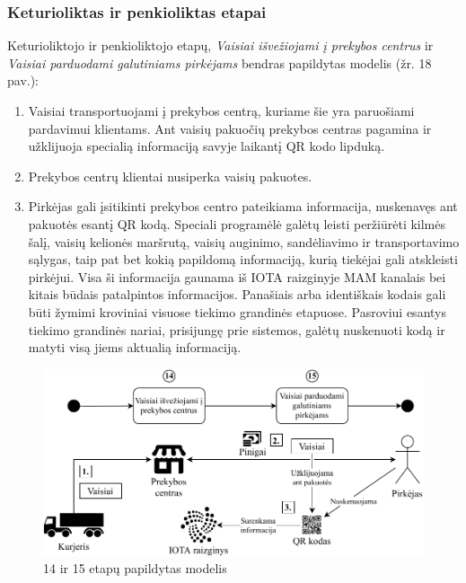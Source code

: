 \subsubsection{Keturioliktas ir penkioliktas etapai}

Keturioliktojo ir penkioliktojo etapų, \textit{Vaisiai išvežiojami į prekybos centrus} ir \textit{Vaisiai parduodami galutiniams pirkėjams} bendras papildytas modelis (žr. 18 pav.):
\begin{enumerate}
    \item Vaisiai transportuojami į prekybos centrą, kuriame šie yra paruošiami pardavimui klientams. Ant vaisių pakuočių prekybos centras pagamina ir užklijuoja specialią informaciją savyje laikantį QR kodo lipduką.
    \item Prekybos centrų klientai nusiperka vaisių pakuotes.
    \item Pirkėjas gali įsitikinti prekybos centro pateikiama informacija, nuskenavęs ant pakuotės esantį QR kodą. Speciali programėlė galėtų leisti peržiūrėti kilmės šalį, vaisių kelionės maršrutą, vaisių auginimo, sandėliavimo ir transportavimo sąlygas, taip pat bet kokią papildomą informaciją, kurią tiekėjai gali atskleisti pirkėjui. Visa ši informacija gaunama iš IOTA raizginyje MAM kanalais bei kitais būdais patalpintos informacijos. Panašiais arba identiškais kodais gali būti žymimi kroviniai visuose tiekimo grandinės etapuose. Pasroviui esantys tiekimo grandinės nariai, prisijungę prie sistemos, galėtų nuskenuoti kodą ir matyti visą jiems aktualią informaciją.
\end{enumerate}

\begin{figure}[H]
    \centering
    \includegraphics[scale=0.8]{images/iota-usecase-14-15}
    \caption{14 ir 15 etapų papildytas modelis}
\end{figure}



